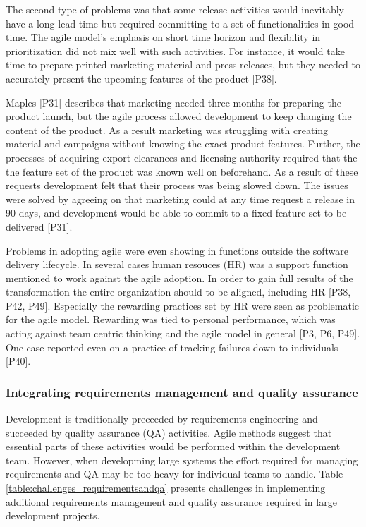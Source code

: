 \documentclass[preprint,authoryear,12pt]{elsarticle}
\begin{document}
The second type of problems was that some release activities would inevitably
have a long lead time but required committing to a set of functionalities in
good time. The agile model's emphasis on short time horizon and flexibility in
prioritization did not mix well with such activities.
For instance, it would take time to prepare printed marketing material and press
releases, but they needed to accurately present the upcoming features of the
product [P38].

Maples [P31] describes that marketing needed three months for preparing the
product launch, but the agile process allowed development to keep changing the
content of the product. As a result marketing was struggling with creating
material and campaigns without knowing the exact product features. Further, the
processes of acquiring export clearances and licensing authority required that
the the feature set of the product was known well on beforehand.
As a result of these requests development felt that their process was being
slowed down. The issues were solved by agreeing on that marketing could at any
time request a release in 90 days, and development would be able to commit to a
fixed feature set to be delivered [P31].


Problems in adopting agile were even showing in functions outside the software
delivery lifecycle. In several cases human resouces (HR) was a support function
mentioned to work against the agile adoption. In order to gain full results of
the transformation the entire organization should to be aligned, including HR
[P38, P42, P49].
Especially the rewarding practices set by HR were seen as problematic for the
agile model. Rewarding was tied to personal performance, which was acting
against team centric thinking and the agile model in general [P3, P6, P49].
One case reported even on a practice of tracking failures down to individuals
[P40].


\subsubsection{Integrating requirements management and quality assurance}

Development is traditionally preceeded by requirements engineering and succeeded
by quality assurance (QA) activities. Agile methods suggest that essential parts
of these activities would be performed within the development team. However,
when developming large systems the effort required for managing requirements and
QA may be too heavy for individual teams to handle. Table
\ref{table:challenges_requirementsandqa} presents challenges in implementing
additional requirements management and quality assurance required in large
development projects.
\end{document}
